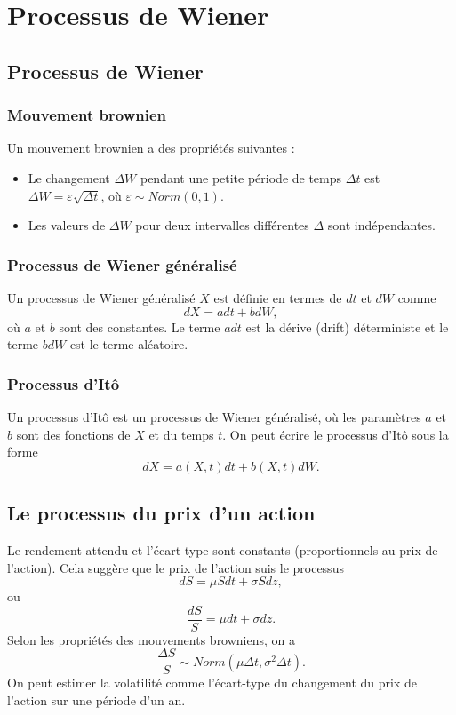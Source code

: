 \chapter{Processus de Wiener}

\section{Processus de Wiener}


\subsection{Mouvement brownien}
Un mouvement brownien a des propriétés suivantes : 

\begin{itemize}
	\item Le changement $\Delta W$ pendant une petite période de temps $\Delta t$ est $\Delta W = \varepsilon \sqrt{\Delta t}$, où $\varepsilon\sim Norm(0, 1)$. 
	\item Les valeurs de $\Delta W$ pour deux intervalles différentes $\Delta$ sont indépendantes. 
\end{itemize}


\subsection{Processus de Wiener généralisé}

Un processus de Wiener généralisé $X$ est définie en termes de $dt$ et $dW$ comme
$$dX = adt + bdW,$$
où $a$ et $b$ sont des constantes. Le terme $adt$ est la dérive (drift) déterministe et le terme $bdW$ est le terme aléatoire.

\subsection{Processus d'Itô}

Un processus d'Itô est un processus de Wiener généralisé, où les paramètres $a$ et $b$ sont des fonctions de $X$ et du temps $t$. On peut écrire le processus d'Itô sous la forme
$$dX = a(X, t) dt + b(X, t)dW.$$

\section{Le processus du prix d'un action}

Le rendement attendu et l'écart-type sont constants (proportionnels au prix de l'action). Cela suggère que le prix de l'action suis le processus
$$dS = \mu S dt + \sigma S dz,$$
ou
$$\frac{dS}{S} = \mu dt + \sigma dz.$$
Selon les propriétés des mouvements browniens, on a
$$\frac{\Delta S}{S} \sim Norm(\mu \Delta t, \sigma^2 \Delta t).$$
On peut estimer la volatilité comme l'écart-type du changement du prix de l'action sur une période d'un an. 

